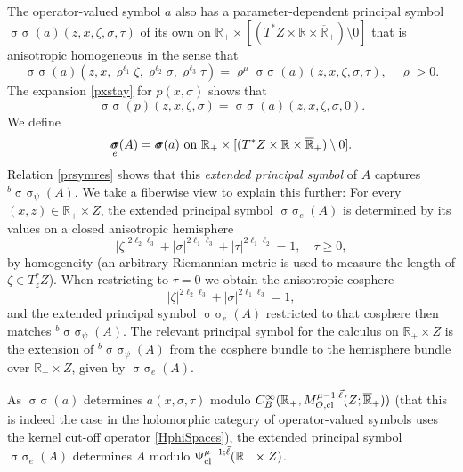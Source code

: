 \documentclass[reqno]{amsart}
\numberwithin{equation}{section}
\theoremstyle{definition}
\def\R{\mathbb R}
\DeclareMathOperator{\sym}{ \sigma\!\!\!\sigma}
\begin{document}
The operator-valued symbol $a$ also has a parameter-dependent principal symbol $\sym(a)(z,x,\zeta,\sigma,\tau)$ of its own on $\R_+ \times [(T^*Z \times \R \times \overline{\R}_+) \setminus 0]$ that is anisotropic homogeneous in the sense that
$$
\sym(a)(z,x,\varrho^{\ell_1}\zeta,\varrho^{\ell_2}\sigma,\varrho^{\ell_3}\tau) = \varrho^{\mu}\sym(a)(z,x,\zeta,\sigma,\tau), \quad \varrho > 0.
$$
The expansion \eqref{pxstay} for $p(x,\sigma)$ shows that
\begin{equation}\label{prsymres}
\sym(p)(z,x,\zeta,\sigma) = \sym(a)(z,x,\zeta,\sigma,0).
\end{equation}
We define
\begin{equation}\label{AeSym}
\sym_e(A) = \sym(a) \textup{ on } \R_+ \times [(T^*Z \times \R \times \overline{\R}_+) \setminus 0].
\end{equation}
Relation \eqref{prsymres} shows that this \emph{extended principal symbol} of $A$ captures ${}^b\sym_{\psi}(A)$. We take a fiberwise view to explain this further: For every $(x,z) \in \R_+\times Z$, the extended principal symbol $\sym_e(A)$ is determined by its values on a closed anisotropic hemisphere
$$
|\zeta|^{2\ell_2\ell_3} + |\sigma|^{2\ell_1\ell_3} + |\tau|^{2\ell_1\ell_2} = 1, \quad \tau \geq 0,
$$
by homogeneity (an arbitrary Riemannian metric is used to measure the length of $\zeta \in T_z^*Z$). When restricting to $\tau = 0$ we obtain the anisotropic cosphere
$$
|\zeta|^{2\ell_2\ell_3} + |\sigma|^{2\ell_1\ell_3} = 1,
$$
and the extended principal symbol $\sym_e(A)$ restricted to that cosphere then matches ${}^b\sym_{\psi}(A)$. The relevant principal symbol for the calculus on $\R_+\times Z$ is the extension of ${}^b\sym_{\psi}(A)$ from the cosphere bundle to the hemisphere bundle over $\R_+\times Z$, given by $\sym_{e}(A)$.

As $\sym(a)$ determines $a(x,\sigma,\tau)$ modulo $C^{\infty}_B(\R_+,M^{\mu-1;\vec{\ell}}_{O,\textup{cl}}(Z;\overline{\R}_+))$ (that this is indeed the case in the holomorphic category of operator-valued symbols uses the kernel cut-off operator \eqref{HphiSpaces}), the extended principal symbol $\sym_e(A)$ determines $A$ modulo $\Psi^{\mu-1;\vec{\ell}}_{\textup{cl}}(\R_+\times Z)$.
\end{document}
